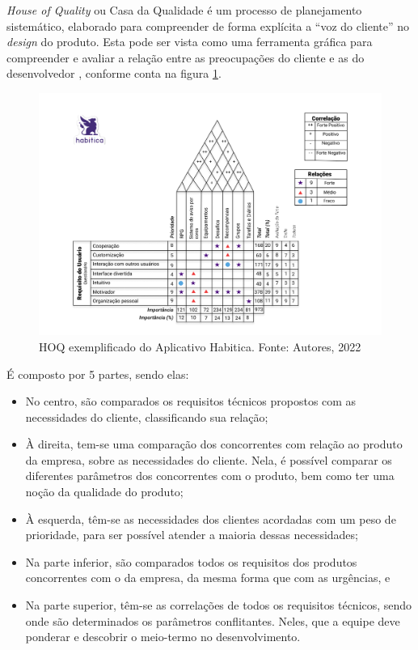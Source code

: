 \label{sec:house_of_quality}

\textit{House of Quality} ou Casa da Qualidade é um processo de planejamento sistemático, elaborado para compreender de forma explícita a “voz do cliente” no \textit{design} do produto. Esta pode ser vista como uma ferramenta gráfica para compreender e avaliar a relação entre as preocupações do cliente e as do desenvolvedor \cite{Howard_1}, conforme conta na figura \ref{fig:hoq}.

\begin{figure}[H]
    \begin{center}
        \includegraphics[scale=0.5]{figuras/referencial_teorico/HOQ.jpg}
        \caption{{HOQ exemplificado do Aplicativo Habitica. Fonte: Autores, 2022}}
        \label{fig:hoq}
    \end{center}
\end{figure}

É composto por 5 partes, sendo elas:

\begin{itemize}
    \item No centro, são comparados os requisitos técnicos propostos com as necessidades do cliente, classificando sua relação;
    \item À direita, tem-se uma comparação dos concorrentes com relação ao produto da empresa, sobre as necessidades do cliente. Nela, é possível comparar os diferentes parâmetros dos concorrentes com o produto, bem como ter uma noção da qualidade do produto;
    \item À esquerda, têm-se as necessidades dos clientes acordadas com um peso de prioridade, para ser possível atender a maioria dessas necessidades;
    \item Na parte inferior, são comparados todos os requisitos dos produtos concorrentes com o da empresa, da mesma forma que com as urgências, e
    \item Na parte superior, têm-se as correlações de todos os requisitos técnicos, sendo onde são determinados os parâmetros conflitantes. Neles, que a equipe deve ponderar e descobrir o meio-termo no desenvolvimento.
\end{itemize}

